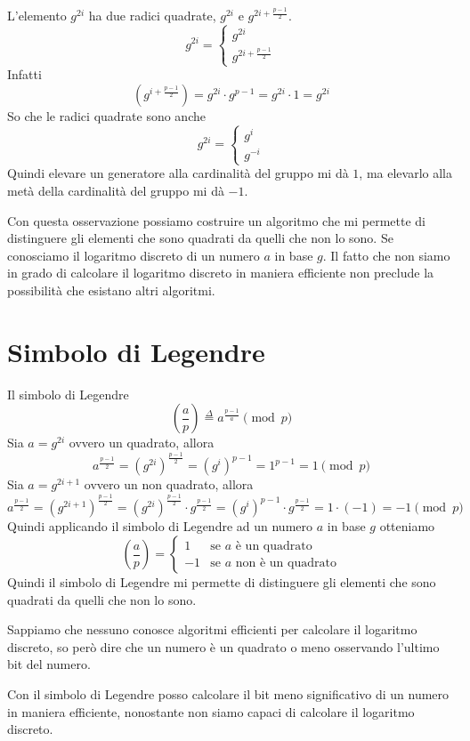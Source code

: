 L'elemento $g^{2i}$ ha due radici quadrate, $g^{2i}$ e $g^{2i + \frac{p-1}{2}}$.
\[
  g^{2i} =
\begin{cases}
  g^{2i} \\
  g^{2i + \frac{p-1}{2}} 
\end{cases}
\]
Infatti
\[
  \left( g^{i + \frac{p-1}{2}}\right) = g^{2i}\cdot g^{p-1} = g^{2i} \cdot 1 = g^{2i}
\]
So che le radici quadrate sono anche 
\[
g^{2i} = 
\begin{cases}
  g^{i} \\
  g^{-i}
\end{cases}
\]
Quindi elevare un generatore alla cardinalità del gruppo mi dà $1$, ma 
elevarlo alla metà della cardinalità del gruppo mi dà $-1$.

Con questa osservazione possiamo costruire un algoritmo che mi permette di
distinguere gli elementi che sono quadrati da quelli che non lo sono.
Se conosciamo il logaritmo discreto di un numero $a$ in base $g$. Il fatto 
che non siamo in grado di calcolare il logaritmo discreto in maniera efficiente
non preclude la possibilità che esistano altri algoritmi. 

\section{Simbolo di Legendre}
Il simbolo di Legendre
\[
  \left(\frac{a}{p}\right) \stackrel{\Delta}{=}
  a^{\frac{p-1}{a}} \pmod p
\]
Sia $a = g^{2i}$ ovvero un quadrato, allora
\[
  a^{\frac{p-1}{2}}= (g^{2i})^{\frac{p-1}{2}} = (g^{i})^{p-1} = 
  1^{p-1} = 1 \pmod p
\]
Sia $a = g^{2i + 1}$ ovvero un non quadrato, allora
\[
  a^{\frac{p-1}{2}}= (g^{2i + 1})^{\frac{p-1}{2}} = (g^{2i})^{\frac{p-1}{2}}
  \cdot g^{\frac{p-1}{2}} = (g^{i})^{p-1} \cdot g^{\frac{p-1}{2}} = 
  1 \cdot (-1) = -1 \pmod p
\]
Quindi applicando il simbolo di Legendre ad un numero $a$ in base $g$ otteniamo
\[
  \left(\frac{a}{p}\right) = 
  \begin{cases}
    1 & \text{se $a$ è un quadrato} \\
    -1 & \text{se $a$ non è un quadrato}
  \end{cases}
\]
Quindi il simbolo di Legendre mi permette di distinguere gli elementi che sono
quadrati da quelli che non lo sono.

Sappiamo che nessuno conosce algoritmi efficienti per calcolare il
logaritmo discreto, so però dire che un numero è un quadrato o meno osservando 
l'ultimo bit del numero.

Con il simbolo di Legendre posso calcolare il bit meno significativo di un numero
in maniera efficiente, nonostante non siamo capaci di calcolare il logaritmo 
discreto.


